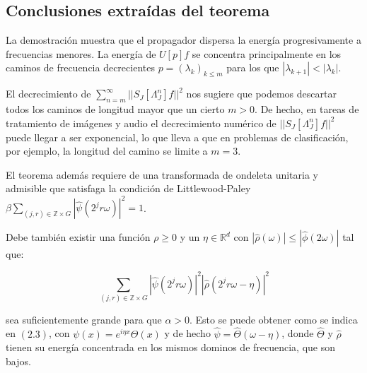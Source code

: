 \subsection{Conclusiones extraídas del teorema}
\noindent La demostración muestra que el propagador dispersa la energía progresivamente a frecuencias menores. La energía de $U[p]f$ se concentra principalmente en los caminos de frecuencia decrecientes $p=(\lambda_k)_{k\leq m}$ para los que $|\lambda_{k+1}|<|\lambda_k|$.


\medskip

\noindent El decrecimiento de $\sum_{n=m}^\infty || S_J[\Lambda_J^n]f||^2$ nos sugiere que podemos descartar todos los caminos de longitud mayor que un cierto $m>0$. De hecho, en tareas de tratamiento de imágenes y audio el decrecimiento numérico de $||S_J[\Lambda_J^n]f||^2$ puede llegar a ser exponencial, lo que lleva a que en problemas de clasificación, por ejemplo, la longitud del camino se limite a $m=3$.

\medskip

\noindent El teorema además requiere de una transformada de ondeleta unitaria y admisible que satisfaga la condición de Littlewood-Paley $\beta \sum_{(j,r)\in \mathbb{Z}\times G}|\widehat{\psi}(2^jr\omega)|^2=1$. 

\medskip

\noindent Debe también existir una función $\rho \geq 0$ y un $\eta \in \mathbb{R}^d$ con $|\widehat{\rho}(\omega)|\leq |\widehat{\phi}(2\omega)|$ tal que: 

$$\sum_{(j,r)\in\mathbb{Z}\times G}|\widehat{\psi}(2^jr\omega)|^2|\widehat{\rho}(2^jr\omega-\eta)|^2$$

\noindent sea suficientemente grande para que $\alpha>0$. Esto se puede obtener como se indica en $(2.3)$, con $\psi(x)=e^{i\eta x}\Theta(x)$ y de hecho $\widehat{\psi}=\widehat{\Theta}(\omega-\eta)$, donde $\widehat{\Theta}$ y $\widehat{\rho}$ tienen su energía concentrada en los mismos dominos de frecuencia, que son bajos.

\endinput